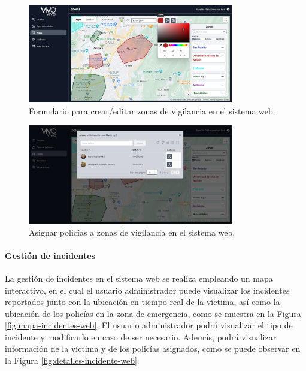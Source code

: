\begin{figure}[H]
    \centering
    \includegraphics[width=0.8\textwidth]{chapters/III-resultados-y-discusion/resources/images/formulario-zona-vigilancia-web.png}
    \caption{Formulario para crear/editar zonas de vigilancia en el sistema web.}
    \label{fig:formulario-zona-vigilancia-web}
\end{figure}

\begin{figure}[H]
    \centering
    \includegraphics[width=0.8\textwidth]{chapters/III-resultados-y-discusion/resources/images/asignar-policias-zona-vigilancia-web.png}
    \caption{Asignar policías a zonas de vigilancia en el sistema web.}
    \label{fig:asignar-policias-zona-vigilancia-web}
\end{figure}

\paragraph{Gestión de incidentes}
La gestión de incidentes en el sistema web se realiza empleando un mapa interactivo, en el cual el usuario administrador puede visualizar
los incidentes reportados junto con la ubicación en tiempo real de la víctima, así como la ubicación de los policías en la zona de emergencia,
como se muestra en la Figura \ref{fig:mapa-incidentes-web}. El usuario administrador podrá visualizar el tipo de incidente y modificarlo en
caso de ser necesario. Además, podrá visualizar información de la víctima y de los policías asignados, como se puede observar en la Figura
\ref{fig:detalles-incidente-web}.

